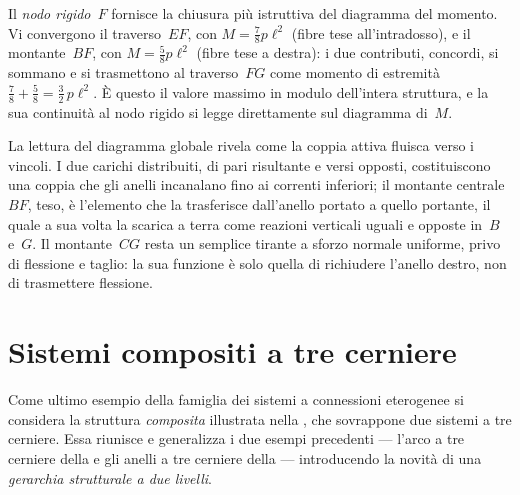 \begin{oss}
	Il \emph{nodo rigido~$F$} fornisce la chiusura più
	istruttiva del diagramma del momento. Vi convergono il
	traverso~$EF$, con $M = \tfrac78 p\ell^2$ (fibre tese
	all'intradosso), e il montante~$BF$, con
	$M = \tfrac58 p\ell^2$ (fibre tese a destra): i due
	contributi, concordi, si sommano e si trasmettono al
	traverso~$FG$ come momento di estremità
	$\tfrac78 + \tfrac58 = \tfrac32\,p\ell^2$. È questo il
	valore massimo in modulo dell'intera struttura, e la sua
	continuità al nodo rigido si legge direttamente sul
	diagramma di~$M$.
\end{oss}

\begin{oss}
	La lettura del diagramma globale rivela come la coppia
	attiva fluisca verso i vincoli. I due carichi distribuiti,
	di pari risultante e versi opposti, costituiscono una
	coppia che gli anelli incanalano fino ai correnti
	inferiori; il montante centrale~$BF$, teso, è l'elemento
	che la trasferisce dall'anello portato a quello portante,
	il quale a sua volta la scarica a terra come reazioni
	verticali uguali e opposte in~$B$ e~$G$. Il montante~$CG$
	resta un semplice tirante a sforzo normale uniforme, privo
	di flessione e taglio: la sua funzione è solo quella di
	richiudere l'anello destro, non di trasmettere flessione.
\end{oss}

\section{Sistemi compositi a tre cerniere}
\label{sec:composito_tre_cerniere}

Come ultimo esempio della famiglia dei sistemi a connessioni eterogenee si
considera la struttura \emph{composita} illustrata nella
, che sovrappone due sistemi
a tre cerniere. Essa riunisce e generalizza i due esempi
precedenti --- l'arco a tre cerniere della
 e gli anelli a tre cerniere
della  --- introducendo la
novità di una \emph{gerarchia strutturale a due livelli}.

